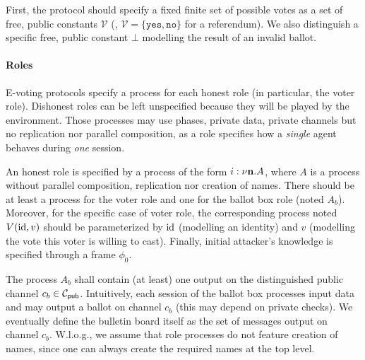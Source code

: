 First, the protocol should specify a fixed finite set of possible votes
as a set of free, public constants
$\mathcal{V}$
(\eg, $\mathcal{V}=\{\mathtt{yes},\mathtt{no}\}$ for a referendum).
We also distinguish a specific free, public constant $\bot$
modelling the result of an invalid ballot.


\paragraph{\textbf{Roles}}
E-voting protocols specify a process for each honest role
(in particular, the voter role).
Dishonest roles can be left unspecified because they will be played by
the environment.
Those processes may use \eg phases, private data, private channels
but no replication nor parallel composition, as a role specifies how a {\em single} agent behaves during
{\em one} session.

\begin{definition}
\label{def:roles}
An honest role is specified by a process of the form
$i: \nu{\mathbf{n}}.A$, where $A$ is a process without parallel composition, replication
nor creation of names. %
There should be at least a process for the voter role and one for the ballot box role (noted $A_b$).
Moreover, for the specific case of voter role, the corresponding process
noted $V(\mathrm{id},v)$ should be parameterized by $\mathrm{id}$ (modelling an identity) and $v$ (modelling
the vote this voter is willing to cast).
Finally, initial attacker's knowledge is specified through a frame $\phi_0$.
\end{definition}

\noindent
The process $A_b$
shall contain (at least) one output on the distinguished public channel $c_b\in\mathcal{C}_{\mathsf{pub}}$.
Intuitively, each session of the ballot box processes input data
and may output a ballot on channel $c_b$
(this may depend on private checks).
We eventually define the bulletin board itself as the set of messages
output on channel $c_b$.
%
W.l.o.g., we assume that role processes do not feature creation of names,
since one can always create the required names at the top level.

